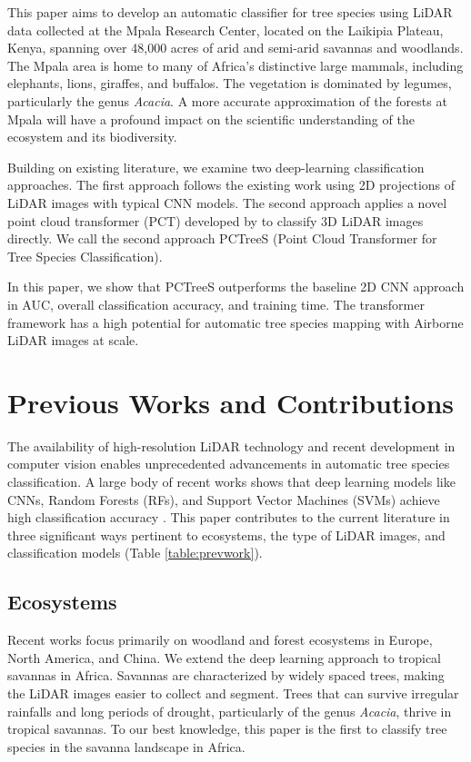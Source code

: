 \documentclass[letterpaper]{article} %
\begin{document}
This paper aims to develop an automatic classifier for tree species using LiDAR data collected at the Mpala Research Center, located on the Laikipia Plateau, Kenya, spanning over 48,000 acres of arid and semi-arid savannas and woodlands. The Mpala area is home to many of Africa’s distinctive large mammals, including elephants, lions, giraffes, and buffalos. The vegetation is dominated by legumes, particularly the genus \textit{Acacia}. A more accurate approximation of the forests at Mpala will have a profound impact on the scientific understanding of the ecosystem and its biodiversity.

Building on existing literature, we examine two deep-learning classification approaches. The first approach follows the existing work using 2D projections of LiDAR images with typical CNN models. The second approach applies a novel point cloud transformer (PCT) developed by
\citealt{guo2021} to classify 3D LiDAR images directly. We call the second approach PCTreeS (Point Cloud Transformer for Tree Species Classification). 

In this paper, we show that PCTreeS outperforms the baseline 2D CNN approach in AUC, overall classification accuracy, and training time. The transformer framework has a high potential for automatic tree species mapping with Airborne LiDAR images at scale.

\section{Previous Works and Contributions}

The availability of high-resolution LiDAR technology and recent development in computer vision enables unprecedented advancements in automatic tree species classification. A large body of recent works shows that deep learning models like CNNs, Random Forests (RFs), and Support Vector Machines (SVMs) achieve high classification accuracy \cite{micha2021, allen, seidel2021predicting, terryn2020tree, xi2020see}. This paper contributes to the current literature in three significant ways pertinent to ecosystems, the type of LiDAR images, and classification models (Table \ref{table:prevwork}). 

\subsection{Ecosystems}

Recent works focus primarily on woodland and forest ecosystems in Europe, North America, and China. We extend the deep learning approach to tropical savannas in Africa. Savannas are characterized by widely spaced trees, making the LiDAR images easier to collect and segment. Trees that can survive irregular rainfalls and long periods of drought, particularly of the genus \textit{Acacia}, thrive in tropical savannas. To our best knowledge, this paper is the first to classify tree species in the savanna landscape in Africa. 
\end{document}
